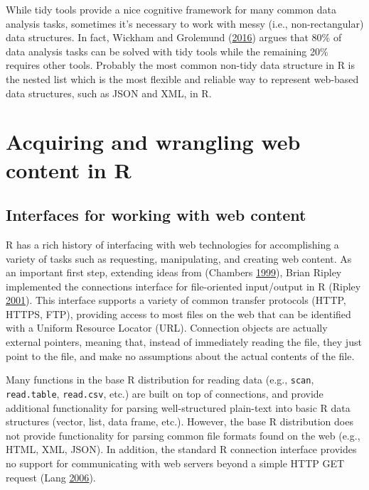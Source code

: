 \documentclass[12pt,]{isuthesis}
\begin{document}
While tidy tools provide a nice cognitive framework for many common data
analysis tasks, sometimes it's necessary to work with messy (i.e.,
non-rectangular) data structures. In fact, Wickham and Grolemund
(\protect\hyperlink{ref-r4ds}{2016}) argues that 80\% of data analysis
tasks can be solved with tidy tools while the remaining 20\% requires
other tools. Probably the most common non-tidy data structure in R is
the nested list which is the most flexible and reliable way to represent
web-based data structures, such as JSON and XML, in R.

\section{Acquiring and wrangling web content in
R}\label{acquiring-and-wrangling-web-content-in-r}

\subsection{Interfaces for working with web
content}\label{interfaces-for-working-with-web-content}

R has a rich history of interfacing with web technologies for
accomplishing a variety of tasks such as requesting, manipulating, and
creating web content. As an important first step, extending ideas from
(Chambers \protect\hyperlink{ref-Chambers:1999}{1999}), Brian Ripley
implemented the connections interface for file-oriented input/output in
R (Ripley \protect\hyperlink{ref-Connections}{2001}). This interface
supports a variety of common transfer protocols (HTTP, HTTPS, FTP),
providing access to most files on the web that can be identified with a
Uniform Resource Locator (URL). Connection objects are actually external
pointers, meaning that, instead of immediately reading the file, they
just point to the file, and make no assumptions about the actual
contents of the file.

Many functions in the base R distribution for reading data (e.g.,
\texttt{scan}, \texttt{read.table}, \texttt{read.csv}, etc.) are built
on top of connections, and provide additional functionality for parsing
well-structured plain-text into basic R data structures (vector, list,
data frame, etc.). However, the base R distribution does not provide
functionality for parsing common file formats found on the web (e.g.,
HTML, XML, JSON). In addition, the standard R connection interface
provides no support for communicating with web servers beyond a simple
HTTP GET request (Lang \protect\hyperlink{ref-Lang:2006us}{2006}).
\end{document}
